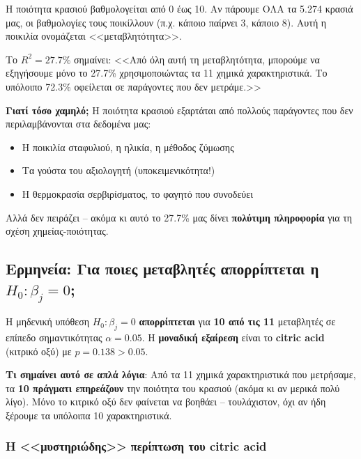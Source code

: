 \documentclass[12pt,a4paper]{article}
\begin{document}
\begin{examplebox}[title={Τι σημαίνει $R^2 = 27.7\%$ στην πράξη;}]
Η ποιότητα κρασιού βαθμολογείται από 0 έως 10. Αν πάρουμε ΟΛΑ τα 5.274 κρασιά μας, οι βαθμολογίες τους ποικίλλουν (π.χ. κάποιο παίρνει 3, κάποιο 8). Αυτή η ποικιλία ονομάζεται <<μεταβλητότητα>>.

Το $R^2 = 27.7\%$ σημαίνει: <<Από όλη αυτή τη μεταβλητότητα, μπορούμε να εξηγήσουμε μόνο το 27.7\% χρησιμοποιώντας τα 11 χημικά χαρακτηριστικά. Το υπόλοιπο 72.3\% οφείλεται σε παράγοντες που δεν μετράμε.>>

\textbf{Γιατί τόσο χαμηλό;} Η ποιότητα κρασιού εξαρτάται από πολλούς παράγοντες που δεν περιλαμβάνονται στα δεδομένα μας:
\begin{itemize}
    \item Η ποικιλία σταφυλιού, η ηλικία, η μέθοδος ζύμωσης
    \item Τα γούστα του αξιολογητή (υποκειμενικότητα!)
    \item Η θερμοκρασία σερβιρίσματος, το φαγητό που συνοδεύει
\end{itemize}

Αλλά δεν πειράζει -- ακόμα κι αυτό το 27.7\% μας δίνει \textbf{πολύτιμη πληροφορία} για τη σχέση χημείας-ποιότητας.
\end{examplebox}

\subsection{Ερμηνεία: Για ποιες μεταβλητές απορρίπτεται η $H_0: \beta_j = 0$;}

\begin{importantbox}
Η μηδενική υπόθεση $H_0: \beta_j = 0$ \textbf{απορρίπτεται} για \textbf{10 από τις 11} μεταβλητές σε επίπεδο σημαντικότητας $\alpha = 0.05$. Η \textbf{μοναδική εξαίρεση} είναι το \textbf{citric acid} (κιτρικό οξύ) με $p = 0.138 > 0.05$.

\textbf{Τι σημαίνει αυτό σε απλά λόγια}: Από τα 11 χημικά χαρακτηριστικά που μετρήσαμε, τα \textbf{10 πράγματι επηρεάζουν} την ποιότητα του κρασιού (ακόμα κι αν μερικά πολύ λίγο). Μόνο το κιτρικό οξύ δεν φαίνεται να βοηθάει -- τουλάχιστον, όχι αν ήδη ξέρουμε τα υπόλοιπα 10 χαρακτηριστικά.
\end{importantbox}

\subsubsection{Η <<μυστηριώδης>> περίπτωση του citric acid}
\end{document}
